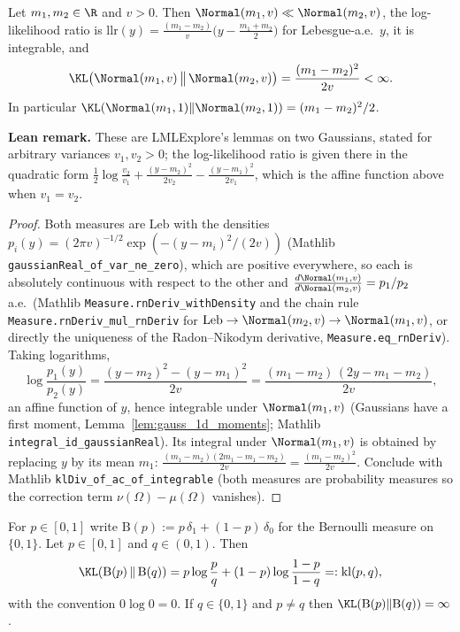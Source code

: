 \begin{lemma}\label{lem:kl_gaussian}
\leanok
{}
Let $m_1, m_2 \in \R$ and $v > 0$. Then $\Normal(m_1, v) \ll \Normal(m_2,v)$, the log-likelihood
ratio is $\mathrm{llr}(y) = \frac{(m_1 - m_2)}{v}\big(y - \frac{m_1+m_2}{2}\big)$ for Lebesgue-a.e.\
$y$, it is integrable, and
\[
  \KL\big(\Normal(m_1,v)\,\big\|\,\Normal(m_2,v)\big) = \frac{(m_1-m_2)^2}{2v} < \infty .
\]
In particular $\KL(\Normal(m_1,1)\|\Normal(m_2,1)) = (m_1-m_2)^2/2$.
\end{lemma}

\textbf{Lean remark.} These are LMLExplore's lemmas on two Gaussians, stated for arbitrary
variances $v_1, v_2 > 0$; the log-likelihood ratio is given there in the quadratic form
$\frac12\log\frac{v_2}{v_1} + \frac{(y-m_2)^2}{2v_2} - \frac{(y-m_1)^2}{2v_1}$, which is the
affine function above when $v_1 = v_2$.

\begin{proof}
\leanok
{}
Both measures are $\mathrm{Leb}$ with the densities
$p_i(y) = (2\pi v)^{-1/2}\exp(-(y-m_i)^2/(2v))$ (Mathlib \texttt{gaussianReal\_of\_var\_ne\_zero}),
which are positive everywhere, so each is absolutely continuous with respect to the other and
$\frac{d\Normal(m_1,v)}{d\Normal(m_2,v)} = p_1/p_2$ a.e.\ (Mathlib
\texttt{Measure.rnDeriv\_withDensity} and the chain rule \texttt{Measure.rnDeriv\_mul\_rnDeriv}
for $\mathrm{Leb} \to \Normal(m_2,v) \to \Normal(m_1,v)$, or directly the uniqueness of the
Radon--Nikodym derivative, \texttt{Measure.eq\_rnDeriv}). Taking logarithms,
\[
  \log\frac{p_1(y)}{p_2(y)} = \frac{(y-m_2)^2 - (y-m_1)^2}{2v}
  = \frac{(m_1-m_2)\,(2y - m_1 - m_2)}{2v} ,
\]
an affine function of $y$, hence integrable under $\Normal(m_1,v)$ (Gaussians have a first
moment, Lemma~\ref{lem:gauss_1d_moments}; Mathlib \texttt{integral\_id\_gaussianReal}). Its
integral under $\Normal(m_1,v)$ is obtained by replacing $y$ by its mean $m_1$:
$\frac{(m_1-m_2)(2m_1 - m_1 - m_2)}{2v} = \frac{(m_1-m_2)^2}{2v}$. Conclude with Mathlib
\texttt{klDiv\_of\_ac\_of\_integrable} (both measures are probability measures so the correction
term $\nu(\Omega)-\mu(\Omega)$ vanishes).
\end{proof}

\begin{lemma}\label{lem:pi_kl_bernoulli}
\leanok
For $p \in [0,1]$ write $\mathrm{B}(p) := p\,\delta_1 + (1-p)\,\delta_0$ for the Bernoulli
measure on $\{0,1\}$. Let $p \in [0,1]$ and $q \in (0,1)$. Then
\[
  \KL(\mathrm{B}(p)\,\|\,\mathrm{B}(q)) = p\log\frac{p}{q} + (1-p)\log\frac{1-p}{1-q}
  =: \mathrm{kl}(p,q),
\]
with the convention $0 \log 0 = 0$. If $q \in \{0,1\}$ and $p \ne q$ then
$\KL(\mathrm{B}(p)\|\mathrm{B}(q)) = \infty$.
\end{lemma}

